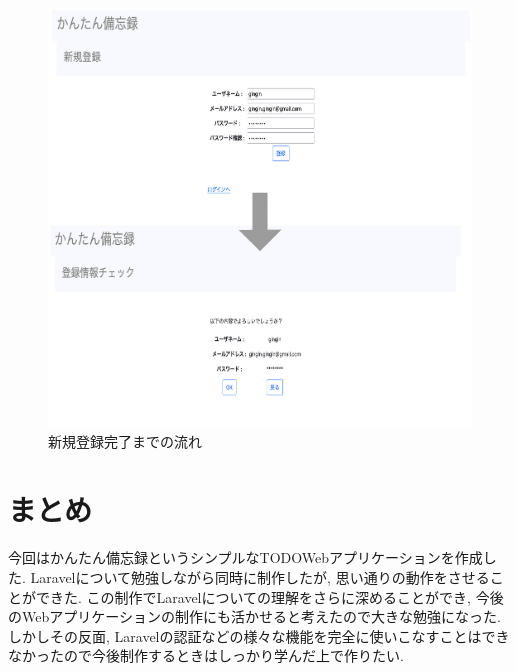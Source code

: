 \documentclass[submit,techrep]{ipsj}
\begin{document}
\begin{figure}[h]
 \centering
 \includegraphics[scale=0.17]{toRegist.eps}
\caption{新規登録完了までの流れ}
 \label{登録まで}
\end{figure}

\section{まとめ}

今回はかんたん備忘録というシンプルなTODOWebアプリケーションを作成した. Laravelについて勉強しながら同時に制作したが, 思い通りの動作をさせることができた. 
この制作でLaravelについての理解をさらに深めることができ, 今後のWebアプリケーションの制作にも活かせると考えたので大きな勉強になった. しかしその反面, Laravelの認証などの様々な機能を完全に使いこなすことはできなかったので今後制作するときはしっかり学んだ上で作りたい. 
\end{document}
